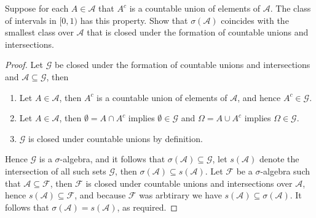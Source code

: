 \documentclass[12pt]{article}
\newcommand{\F}{\mathcal{F}}
\newcommand{\A}{\mathcal{A}}
\newcommand{\G}{\mathcal{G}}
\newcommand{\seq}{\subseteq}
\newcommand{\Om}{\Omega}
\newcommand{\es}{\emptyset}
\newcommand{\un}{\cup}
\newcommand{\ic}{\cap}
\newenvironment{exercise}[2][Exercise]{\begin{trivlist}
\item[\hskip \labelsep {\bfseries #1}\hskip \labelsep {\bfseries #2.}]}{\end{trivlist}}
\begin{document}
\begin{exercise}{2.8}
    Suppose for each $A \in \A$ that $A^{c}$ is a countable union of elements of $\A$. The class of intervals in $[0, 1)$ has this property. Show that $\sigma (\A)$ coincides with the smallest class over $\A$ that is closed under the formation of countable unions and intersections.
\end{exercise}
\begin{proof}
    Let $\G$ be closed under the formation of countable unions and intersections and $\A \seq \G$, then
    \begin{enumerate}
        \item Let $A \in \A$, then $A^{c}$ is a countable union of elements of $\A$, and hence $A^{c} \in \G$.
        \item Let $A \in \A$, then $\es = A \ic A^{c}$ implies $\es \in \G$ and $\Om = A \un A^{c}$ implies $\Om \in \G$.
        \item $\G$ is closed under countable unions by definition.
    \end{enumerate}
    Hence $\G$ is a $\sigma$-algebra, and it follows that $\sigma (\A) \seq \G$, let $s(\A)$ denote the intersection of all such sets $\G$, then $\sigma (\A) \seq s(\A)$. Let $\F$ be a $\sigma$-algebra such that $\A \seq \F$, then $\F$ is closed under countable unions and intersections over $\A$, hence $s(\A) \seq \F$, and because $\F$ was arbtirary we have $s(\A) \seq \sigma(\A)$. It follows that $\sigma (\A) = s(\A)$, as required.
\end{proof}
\end{document}
